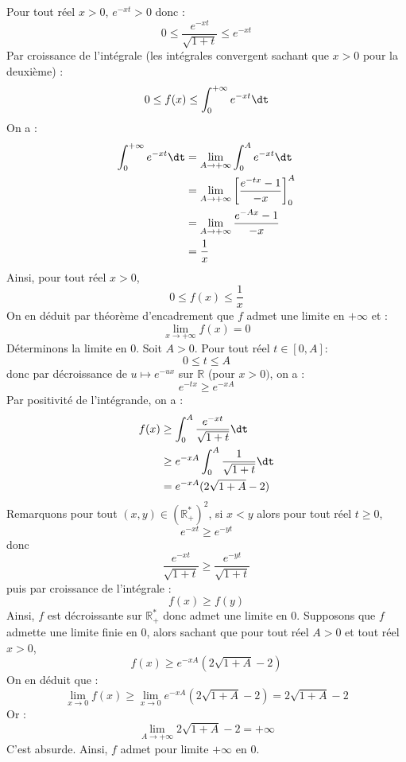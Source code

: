 \documentclass[a4paper,10pt]{report}
\begin{document}
\begin{enumerate}
Pour tout réel $x>0$, $e^{-xt} > 0$ donc :
$$  0 \leq \dfrac{e^{-xt}}{\sqrt{1+t}} \leq e^{-xt}$$
Par croissance de l'intégrale (les intégrales convergent sachant que $x>0$ pour la deuxième) :
$$ 0 \leq f(x) \leq \int_0^{+ \infty} e^{-xt} \dt$$
On a :
\begin{align*}
\int_0^{+ \infty} e^{-xt} \dt & =\lim_{A \rightarrow + \infty} \int_0^{A} e^{-xt} \dt \\
& = \lim_{A \rightarrow + \infty} \left[ \dfrac{e^{-tx}-1}{-x} \right]_0^A \\
&  = \lim_{A \rightarrow + \infty} \dfrac{e^{-Ax}-1}{-x} \\
& = \dfrac{1}{x}
\end{align*}
Ainsi, pour tout réel $x>0$,
$$ 0 \leq f(x) \leq \dfrac{1}{x}$$
On en déduit par théorème d'encadrement que $f$ admet une limite en $+ \infty$ et :
$$ \lim_{x \rightarrow + \infty} f(x) = 0$$
Déterminons la limite en $0$. Soit $A >0$. Pour tout réel $t \in [0,A]$:
$$ 0 \leq t \leq A$$
donc par décroissance de $u \mapsto e^{-ux}$ sur $\mathbb{R}$ (pour $x>0)$, on a :
$$  e^{-tx} \geq  e^{-xA}$$
Par positivité de l'intégrande, on a :
\begin{align*}
 f(x) & \geq \int_0^{A} \dfrac{e^{-xt}}{\sqrt{1+t}}  \dt  \\
 & \geq e^{-xA} \int_0^A \dfrac{1}{\sqrt{1+t}}  \dt  \\ 
 & = e^{-xA} (2 \sqrt{1+A}-2) 
\end{align*}
Remarquons pour tout $(x,y) \in (\mathbb{R}_+^*)^2$, si $x<y$ alors pour tout réel $t \geq 0$,
$$ e^{-xt} \geq e^{-yt}$$
donc 
$$ \dfrac{e^{-xt}}{\sqrt{1+t}} \geq \dfrac{e^{-yt}}{\sqrt{1+t}}$$
puis par croissance de l'intégrale :
$$ f(x) \geq f(y)$$
Ainsi, $f$ est décroissante sur $\mathbb{R}_+^*$ donc admet une limite en $0$. Supposons que $f$ admette une limite finie en $0$, alors sachant que pour tout réel $A>0$ et tout réel $x>0$,
$$ f(x) \geq  e^{-xA} (2 \sqrt{1+A}-2) $$
On en déduit que :
$$ \lim_{x \rightarrow 0} f(x) \geq \lim_{x \rightarrow 0} e^{-xA} (2 \sqrt{1+A}-2) = 2 \sqrt{1+A}-2$$
Or :
$$ \lim_{A \rightarrow + \infty} 2 \sqrt{1+A}-2 = + \infty$$
C'est absurde. Ainsi, $f$ admet pour limite $+ \infty$ en $0$.
\end{enumerate}
\end{document}
